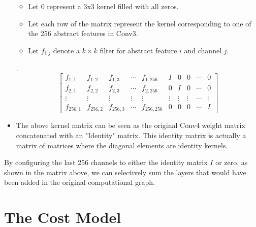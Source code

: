 \documentclass[12pt,a4paper,twoside,openright,bibliography=totocnumbered]{report}
\begin{document}
\begin{itemize}
		\begin{itemize}
			\item Let 0 represent a 3x3 kernel filled with all zeros.
			\item Let each row of the matrix represent the kernel corresponding to one of the 256 abstract features in Conv3.
			\item Let $f_{i,j}$ denote a $k \times k$ filter for abstract feature $i$ and channel $j$.
		\end{itemize} . 
		\[
			\begin{bmatrix}
					f_{1,1} & f_{1,2} & f_{1,3} & \cdots & f_{1,256} & I & 0 & 0 & \cdots & 0\\
					f_{2,1} & f_{2,2} & f_{2,3} & \cdots & f_{2,256} & 0 & I & 0 & \cdots & 0\\
					\vdots & \vdots & \vdots & \vdots & \vdots & \vdots & \vdots & \vdots & \cdots & \vdots \\
					f_{256,1} & f_{256,2} & f_{256,3} & \cdots & f_{256,256} & 0 & 0 & 0 & \cdots & I
			\end{bmatrix}
	\]
	\item The above kernel matrix can be seen as the original Conv4 weight matrix concatenated with an "Identity" matrix. This identity matrix is actually a matrix of matrices where the diagonal elements are identity kernels.
	\end{itemize}
	By configuring the last 256 channels to either the identity matrix  $I$ or zero, as shown in the matrix above, we can selectively sum the layers that would have been added in the original computational graph.

	\section{The Cost Model}
		
		
\end{document}
